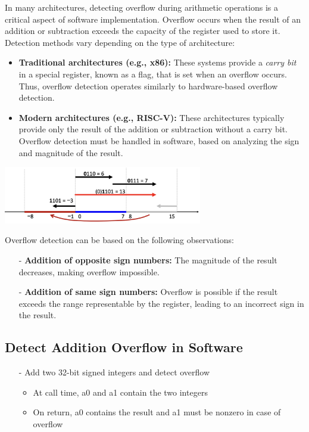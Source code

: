 In many architectures, detecting overflow during arithmetic operations is a critical aspect of software implementation. Overflow occurs when the result of an addition or subtraction exceeds the capacity of the register used to store it. Detection methods vary depending on the type of architecture:

\begin{itemize}
    \item \textbf{Traditional architectures (e.g., x86):} These systems provide a \textit{carry bit} in a special register, known as a flag, that is set when an overflow occurs. Thus, overflow detection operates similarly to hardware-based overflow detection.
    
    \item \textbf{Modern architectures (e.g., RISC-V):} These architectures typically provide only the result of the addition or subtraction without a carry bit. Overflow detection must be handled in software, based on analyzing the sign and magnitude of the result.
\end{itemize}

\begin{center}
    \includegraphics[width=0.65\textwidth]{chapters/chapter1e/images/overflow.png}
\end{center}
Overflow detection can be based on the following observations:
\begin{itemize}
    \item[-] \textbf{Addition of opposite sign numbers:} The magnitude of the result decreases, making overflow impossible.
    \item[-] \textbf{Addition of same sign numbers:} Overflow is possible if the result exceeds the range representable by the register, leading to an incorrect sign in the result.
\end{itemize}
\subsection{Detect Addition Overflow in Software}
\begin{itemize}
    \item[-] Add two 32-bit signed integers and detect overflow
    \begin{itemize}
        \item At call time, a0 and a1 contain the two integers
        \item On return, a0 contains the result and a1 must be nonzero in case of overflow
    \end{itemize}
\end{itemize}


